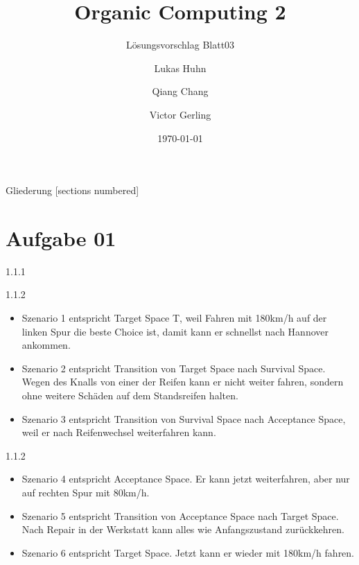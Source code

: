 \documentclass{ocbeameruni}
\title{Organic Computing 2}
\subtitle{Lösungsvorschlag Blatt03}
\date{\today}
\author{Lukas Huhn \and Qiang Chang \and Victor Gerling}
\institute{%
  Universität Augsburg\\
  Institut für Informatik\\
  Lehrstuhl für Organic Computing
}
\begin{document}
\maketitle


\begin{frame}{Gliederung}
  [sections numbered]
  \tableofcontents
\end{frame}


\section{Aufgabe 01}

\begin{frame}{1.1.1}
\end{frame}

\begin{frame}{1.1.2}
    \begin{itemize} 
    \item Szenario 1 entspricht Target Space T, weil Fahren mit 180km/h auf der linken Spur die beste Choice ist, damit kann er schnellst nach Hannover ankommen.
    \item Szenario 2 entspricht Transition von Target Space nach Survival Space. Wegen des Knalls von einer der Reifen kann er nicht weiter fahren, sondern ohne 
weitere Schäden auf dem Standsreifen halten.
    \item Szenario 3 entspricht Transition von Survival Space nach Acceptance Space, weil er nach Reifenwechsel weiterfahren kann.
    \end{itemize}
\end{frame}

\begin{frame}{1.1.2}
    \begin{itemize} 
    \item Szenario 4 entspricht Acceptance Space. Er kann jetzt weiterfahren, aber nur auf rechten Spur mit 80km/h.
    \item Szenario 5 entspricht Transition von Acceptance Space nach Target Space. Nach Repair in der Werkstatt kann alles wie Anfangszustand zurückkehren. 
    \item Szenario 6 entspricht Target Space. Jetzt kann er wieder mit 180km/h fahren.
    \end{itemize}
\end{frame}
\end{document}
